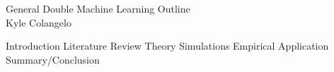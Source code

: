 \documentclass[12pt]{article}
\begin{document}
	\begin{center}
		General Double Machine Learning Outline\\
		Kyle Colangelo
	\end{center}
\begin{outline}[enumerate]
	\1 Introduction
	\1 Literature Review
	\1 Theory
	\1 Simulations
	\1 Empirical Application
	\1 Summary/Conclusion
	
\end{outline}
\newpage
\end{document}
